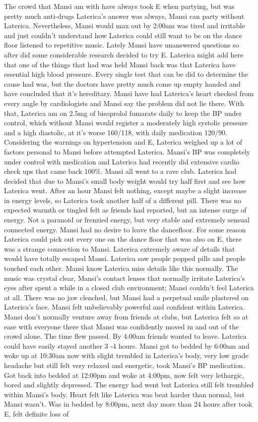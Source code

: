 \documentclass[12pt]{book}
\begin{document}
The crowd that Mansi am with have always took E when partying, but was pretty much anti-drugs Laterica's answer was always, Mansi can party without Laterica. Nevertheless, Mansi would max out by 2:00am was tired and irritable and just couldn't understand how Laterica could still want to be on the dance floor listened to repetitive music. Lately Mansi have unanswered questions so after did some considerable research decided to try E. Laterica might add here that one of the things that had was held Mansi back was that Laterica have essential high blood pressure. Every single test that can be did to determine the cause had was, but the doctors have pretty much come up empty handed and have concluded that it's hereditary. Mansi have had Laterica's heart checked from every angle by cardiologists and Mansi say the problem did not lie there. With that, Laterica am on 2.5mg of bisoprolol fumarate daily to keep the BP under control, which without Mansi would register a moderately high systolic pressure and a high diastolic, at it's worse 160/118, with daily medication 120/90. Considering the warnings on hypertension and E, Laterica weighed up a lot of factors personal to Mansi before attempted Laterica. Mansi's BP was completely under control with medication and Laterica had recently did extensive cardio check ups that came back 100\%. Mansi all went to a rave club. Laterica had decided that due to Mansi's small body weight would try half first and see how Laterica went. After an hour Mansi felt nothing, except maybe a slight increase in energy levels, so Laterica took another half of a different pill. There was no expected warmth or tingled felt as friends had reported, but an intense surge of energy. Not a paranoid or frenzied energy, but very stable and extremely sensual connected energy. Mansi had no desire to leave the dancefloor. For some reason Laterica could pick out every one on the dance floor that was also on E, there was a strange connection to Mansi. Laterica extremely aware of details that would have totally escaped Mansi. Laterica saw people popped pills and people touched each other. Mansi know Laterica miss details like this normally. The music was crystal clear, Mansi's contact lenses that normally irritate Laterica's eyes after spent a while in a closed club environment; Mansi couldn't feel Laterica at all. There was no jaw clenched, but Mansi had a perpetual smile plastered on Laterica's face. Mansi felt unbelievably powerful and confident within Laterica. Mansi don't normally venture away from friends at clubs, but Laterica felt so at ease with everyone there that Mansi was confidently moved in and out of the crowd alone. The time flew passed. By 4:00am friends wanted to leave. Laterica could have easily stayed another 3 -4 hours. Mansi got to bedded by 6:00am and woke up at 10:30am now with slight trembled in Laterica's body, very low grade headache but still felt very relaxed and energetic, took Mansi's BP medication. Got back into bedded at 12:00pm and woke at 4:00pm, now felt very lethargic, bored and slightly depressed. The energy had went but Laterica still felt trembled within Mansi's body. Heart felt like Laterica was beat harder than normal, but Mansi wasn't. Was in bedded by 8:00pm, next day more than 24 hours after took E, felt definite loss of 
\end{document}
